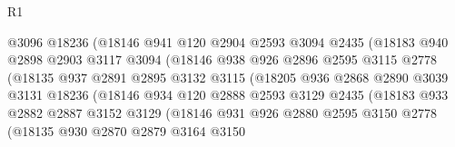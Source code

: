 \begin{lexlean}{R1}
\begin{coremodule}
                            @3096
                            @18236
                            (@18146
                              @941
                              @120
                              @2904
                              @2593
                              @3094
                              @2435
                              (@18183
                                @940
                                @2898
                                @2903
                                @3117
                                @3094
                                (@18146
                                  @938
                                  @926
                                  @2896
                                  @2595
                                  @3115
                                  @2778
                                  (@18135
                                    @937
                                    @2891
                                    @2895
                                    @3132
                                    @3115
                                    (@18205
                                      @936
                                      @2868
                                      @2890
                                      @3039
                                      @3131
                                      @18236
                                      (@18146
                                        @934
                                        @120
                                        @2888
                                        @2593
                                        @3129
                                        @2435
                                        (@18183
                                          @933
                                          @2882
                                          @2887
                                          @3152
                                          @3129
                                          (@18146
                                            @931
                                            @926
                                            @2880
                                            @2595
                                            @3150
                                            @2778
                                            (@18135
                                              @930
                                              @2870
                                              @2879
                                              @3164
                                              @3150

\end{coremodule}
\end{lexlean}
